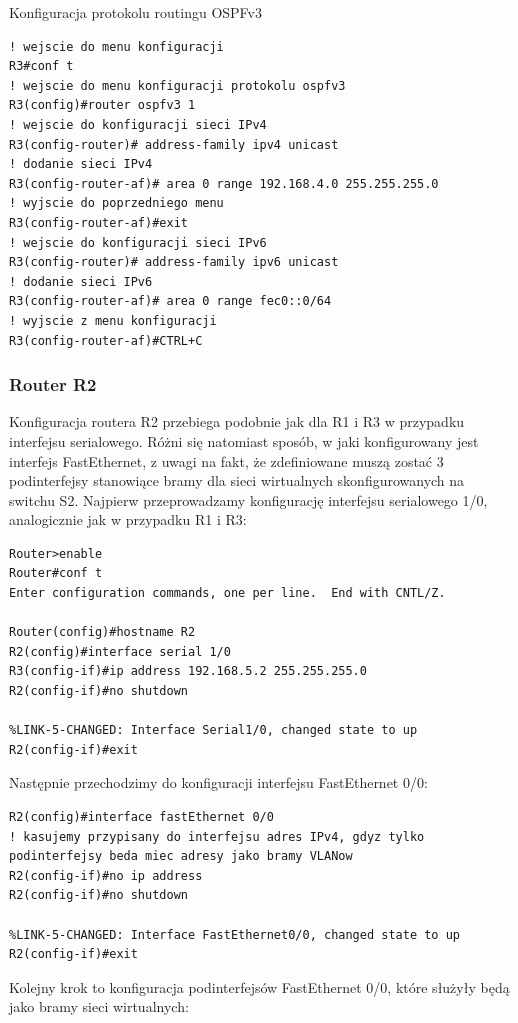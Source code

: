 \documentclass[polish,11pt,a4paper,twoside]{article}
\begin{document}
Konfiguracja protokolu routingu OSPFv3
\begin{lstlisting}
! wejscie do menu konfiguracji
R3#conf t
! wejscie do menu konfiguracji protokolu ospfv3
R3(config)#router ospfv3 1 
! wejscie do konfiguracji sieci IPv4
R3(config-router)# address-family ipv4 unicast 
! dodanie sieci IPv4
R3(config-router-af)# area 0 range 192.168.4.0 255.255.255.0 
! wyjscie do poprzedniego menu
R3(config-router-af)#exit
! wejscie do konfiguracji sieci IPv6
R3(config-router)# address-family ipv6 unicast
! dodanie sieci IPv6
R3(config-router-af)# area 0 range fec0::0/64
! wyjscie z menu konfiguracji
R3(config-router-af)#CTRL+C
\end{lstlisting}

\subsubsection{Router R2}
Konfiguracja routera R2 przebiega podobnie jak dla R1 i R3 w przypadku interfejsu serialowego. Różni się natomiast sposób, w jaki konfigurowany jest interfejs FastEthernet, z uwagi na fakt, że zdefiniowane muszą zostać 3 podinterfejsy stanowiące bramy dla sieci wirtualnych skonfigurowanych na switchu S2.
Najpierw przeprowadzamy konfigurację interfejsu serialowego 1/0, analogicznie jak w przypadku R1 i R3:
\begin{lstlisting}
Router>enable
Router#conf t
Enter configuration commands, one per line.  End with CNTL/Z.

Router(config)#hostname R2
R2(config)#interface serial 1/0
R3(config-if)#ip address 192.168.5.2 255.255.255.0
R2(config-if)#no shutdown 

%LINK-5-CHANGED: Interface Serial1/0, changed state to up
R2(config-if)#exit
\end{lstlisting}
Następnie przechodzimy do konfiguracji interfejsu FastEthernet 0/0:
\begin{lstlisting}
R2(config)#interface fastEthernet 0/0
! kasujemy przypisany do interfejsu adres IPv4, gdyz tylko podinterfejsy beda miec adresy jako bramy VLANow
R2(config-if)#no ip address
R2(config-if)#no shutdown 

%LINK-5-CHANGED: Interface FastEthernet0/0, changed state to up
R2(config-if)#exit
\end{lstlisting}
Kolejny krok to konfiguracja podinterfejsów FastEthernet 0/0, które służyły będą jako bramy sieci wirtualnych:
\end{document}
